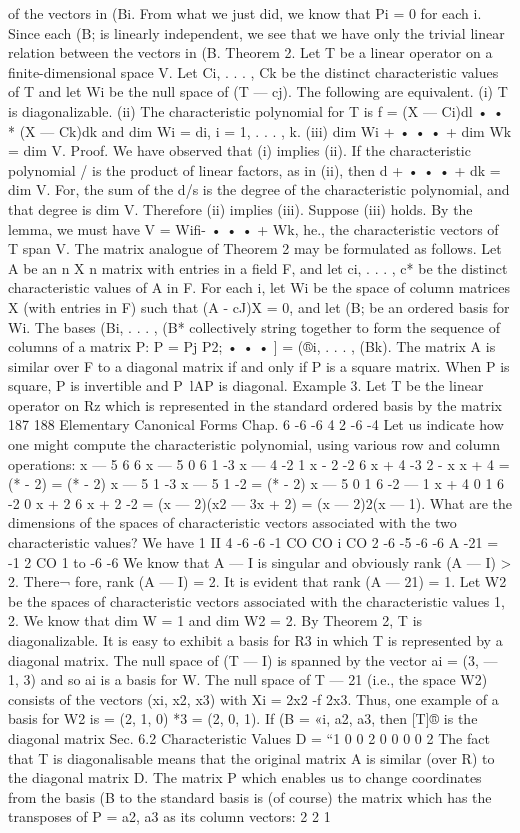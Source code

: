 of the vectors in (Bi. From what we just did, we know that Pi = 0 for each i. Since each (B; is linearly independent, we see that we have only the trivial linear relation between the vectors in (B. Theorem 2. Let T be a linear operator on a finite-dimensional space V. Let Ci, . . . , Ck be the distinct characteristic values of T and let Wi be the null space of (T — cj). The following are equivalent. (i) T is diagonalizable. (ii) The characteristic polynomial for T is f = (X — Ci)dl • • * (X — Ck)dk and dim Wi = di, i = 1, . . . , k. (iii) dim Wi + • • • + dim Wk = dim V. Proof. We have observed that (i) implies (ii). If the characteristic polynomial / is the product of linear factors, as in (ii), then d + • • • + dk = dim V. For, the sum of the d/s is the degree of the characteristic polynomial, and that degree is dim V. Therefore (ii) implies (iii). Suppose (iii) holds. By the lemma, we must have V = Wifi- • • • + Wk, he., the characteristic vectors of T span V. The matrix analogue of Theorem 2 may be formulated as follows. Let A be an n X n matrix with entries in a field F, and let ci, . . . , c* be the distinct characteristic values of A in F. For each i, let Wi be the space of column matrices X (with entries in F) such that (A - cJ)X = 0, and let (B; be an ordered basis for Wi. The bases (Bi, . . . , (B* collectively string together to form the sequence of columns of a matrix P: P = Pj P2; • • • ] = (®i, . . . , (Bk). The matrix A is similar over F to a diagonal matrix if and only if P is a square matrix. When P is square, P is invertible and P~lAP is diagonal. Example 3. Let T be the linear operator on Rz which is represented in the standard ordered basis by the matrix 187 188 Elementary Canonical Forms Chap. 6 -6 -6 4 2 -6 -4 Let us indicate how one might compute the characteristic polynomial, using various row and column operations: x — 5 6 6 x — 5 0 6 1 -3 x — 4 -2  1 x - 2 -2 6 x + 4 -3 2 - x x + 4 = (* - 2) = (* - 2) x — 5 1 -3 x — 5 1 -2 = (* - 2) x — 5 0 1 6 -2 — 1 x + 4 0 1 6 -2 0 x + 2 6 x + 2 -2 = (x — 2)(x2 — 3x + 2) = (x — 2)2(x — 1). What are the dimensions of the spaces of characteristic vectors associated with the two characteristic values? We have 1 II 4 -6 -6 -1 CO CO i CO 2 -6 -5 -6 -6 A -21 = -1 2 CO 1 to -6 -6 We know that A — I is singular and obviously rank (A — I) > 2. There¬ fore, rank (A — I) = 2. It is evident that rank (A — 21) = 1. Let W2 be the spaces of characteristic vectors associated with the characteristic values 1, 2. We know that dim W = 1 and dim W2 = 2. By Theorem 2, T is diagonalizable. It is easy to exhibit a basis for R3 in which T is represented by a diagonal matrix. The null space of (T — I) is spanned by the vector ai = (3, — 1, 3) and so ai is a basis for W. The null space of T — 21 (i.e., the space W2) consists of the vectors (xi, x2, x3) with Xi = 2x2 -f 2x3. Thus, one example of a basis for W2 is = (2, 1, 0) *3 = (2, 0, 1). If (B = «i, a2, a3, then [T]® is the diagonal matrix Sec. 6.2 Characteristic Values D = “1 0 0 2 0 0 0 0 2 The fact that T is diagonalisable means that the original matrix A is similar (over R) to the diagonal matrix D. The matrix P which enables us to change coordinates from the basis (B to the standard basis is (of course) the matrix which has the transposes of P = a2, a3 as its column vectors: 2 2 1 